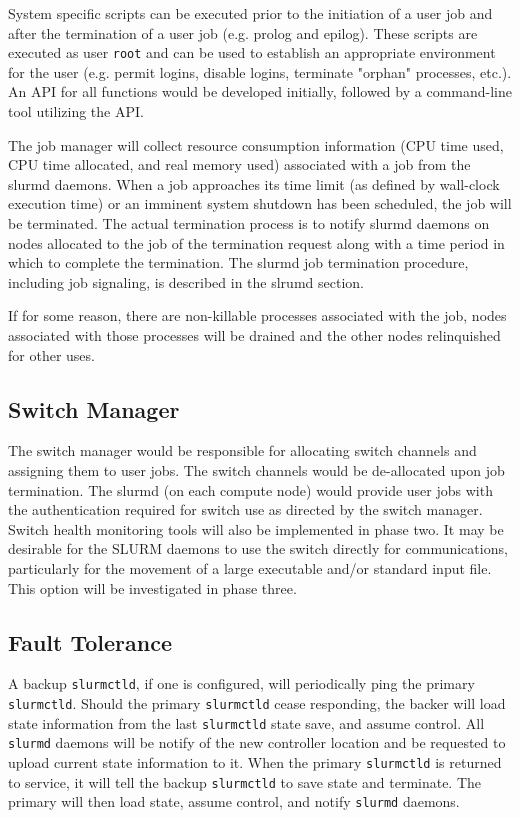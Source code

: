 System specific scripts can be executed prior to the initiation of a user job
and after the termination of a user job (e.g. prolog and epilog). 
These scripts are executed as user {\tt root} and can be used to establish an 
appropriate environment for the user (e.g. permit
logins, disable logins, terminate "orphan" processes, etc.). 
An API for all functions would be developed initially, followed by a  
command-line tool utilizing the API. 

The job manager will collect resource consumption information 
(CPU time used, CPU time allocated, and real memory used) associated 
with a job from the slurmd daemons. 
When a job approaches its time limit (as defined by wall-clock execution 
time) or an imminent system shutdown has been scheduled, the job will be 
terminated. 
The actual termination process is to notify slurmd daemons on nodes 
allocated to the job of the termination request along with a time 
period in which to complete the termination. 
The slurmd job termination procedure, including job signaling, 
is described in the slrumd section. 

If for some reason, there are non-killable processes associated with 
the job, nodes associated with those processes will be drained and 
the other nodes relinquished for other uses.

\subsection{Switch Manager}

The switch manager would be responsible for allocating switch channels and assigning 
them to user jobs. The switch channels would be de-allocated upon job termination. 
The slurmd (on each compute node) would provide user jobs with the authentication 
required for switch use as directed by the switch manager. Switch health monitoring tools will 
also be implemented in phase two. It may be desirable for the SLURM daemons to use the
switch directly for communications, particularly for the movement of a large 
executable and/or standard input file. This option will be investigated in phase
three. 

\subsection{Fault Tolerance}

A backup {\tt slurmctld}, if one is configured, will periodically ping 
the primary {\tt slurmctld}. 
Should the primary {\tt slurmctld} cease responding, the backer will 
load state information from the last {\tt slurmctld} state save, and 
assume control. 
All {\tt slurmd} daemons will be notify of the new controller location 
and be requested to upload current state information to it.
When the primary {\tt slurmctld} is returned to service, it will 
tell the backup {\tt slurmctld} to save state and terminate. 
The primary will then load state, assume control, and notify 
{\tt slurmd} daemons.

